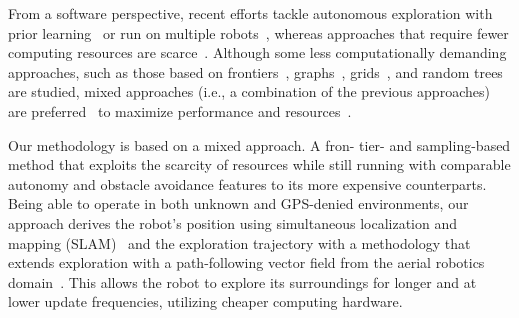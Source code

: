 \documentclass[letterpaper,10pt,conference,twoside]{IEEEtran}
\theoremstyle{definition}
\begin{document}
From a software perspective, 
recent efforts tackle autonomous exploration with prior learning~\cite{shrestha2019learned} or run on multiple robots~\cite{kulkarni2022autonomous,tranzatto2022cerberus,roucek2020darpa}, whereas %
approaches %
that require fewer computing resources are scarce~\cite{bircher2016receding,batinovic2021multi,faisal2021low,muller2021openbot}. 
%
Although some %
less computationally demanding approaches, such as those based on frontiers~\cite{kim2022autonomous,roucek2020darpa,batinovic2021multi}, graphs~\cite{kulkarni2022autonomous,tranzatto2022cerberus,dang2019graph}, grids~\cite{corah2019communication,tabib2022autonomous}, and random trees %
are studied, mixed approaches (i.e., a combination of the previous approaches) are %
preferred~\cite{%
shrestha2019learned,bircher2016receding,surmann2003autonomous,qiao2019sampling,
dai2020fast} to maximize performance and resources~\cite{placed2022survey,bircher2016receding}.
%

Our methodology is based on a mixed approach. A fron- tier- and sampling-based method that exploits the scarcity of resources while still running %
with comparable autonomy and obstacle avoidance features to its more expensive counterparts. %
%
Being able to operate in both unknown and GPS-denied environments, our %
approach derives the 
robot's 
position using %
simultaneous localization and mapping (SLAM)~\cite{labbe2019rtab} %
and the exploration trajectory with a %
methodology that extends exploration %
with a path-following vector field %
from the aerial robotics domain~\cite{seewald2022energy,garcia2017guidance,seewaldphdthesis}. This allows the robot to explore its surroundings for longer and at lower update frequencies, %
utilizing cheaper computing hardware. %
\end{document}
